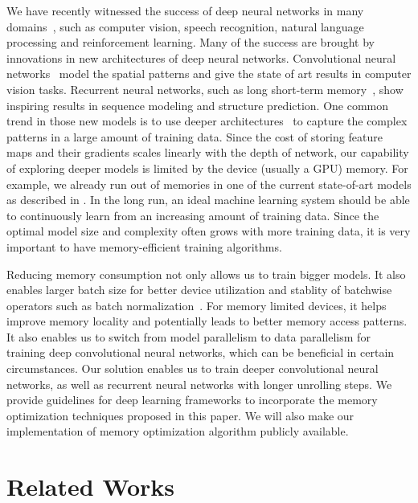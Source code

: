 We have recently witnessed the success of deep neural networks in many domains~\cite
{Goodfellow-et-al-2016-Book}, such as computer vision, speech recognition, natural language processing and reinforcement learning. Many of the success are brought by innovations in new architectures of deep neural networks. Convolutional neural networks~\cite{lecun-cnn,Alexnet,Ioffe+Szegedy-2015, He2015} model the spatial patterns and give the state of art results in computer vision tasks. Recurrent neural networks, such as long short-term memory~\cite{Hochreiter:LSTM}, show inspiring results in sequence modeling and structure prediction. One common trend in those new models is to use deeper architectures~\cite
{srivastava2015highway,Alexnet,Ioffe+Szegedy-2015, He2015} to capture the complex patterns in a large amount of training data. Since the cost of storing feature maps and their gradients scales linearly with the depth of network, our capability of exploring deeper models is limited by the device (usually a GPU) memory. For example, we already run out of memories in one of the current state-of-art models as described in \cite{He2016}. In the long run, an ideal machine learning system should be able to continuously learn from an increasing amount of training data. Since the optimal model size and complexity often grows with more training data, it is very important to have memory-efficient training algorithms.

Reducing memory consumption not only allows us to train bigger models. It also enables larger batch size for better device utilization and stablity of batchwise operators such as batch normalization~\cite{Ioffe+Szegedy-2015}. For memory limited devices, it helps improve memory locality and potentially leads to better memory access patterns. It also enables us to switch from model parallelism to data parallelism for training deep convolutional neural networks, which can be beneficial in certain circumstances. Our solution enables us to train deeper convolutional neural networks, as well as recurrent neural networks with longer unrolling steps. We provide guidelines for deep learning frameworks to incorporate the memory optimization techniques proposed in this paper. We will also make our implementation of memory optimization algorithm publicly available.

\section{Related Works}\label{sec:rel}

